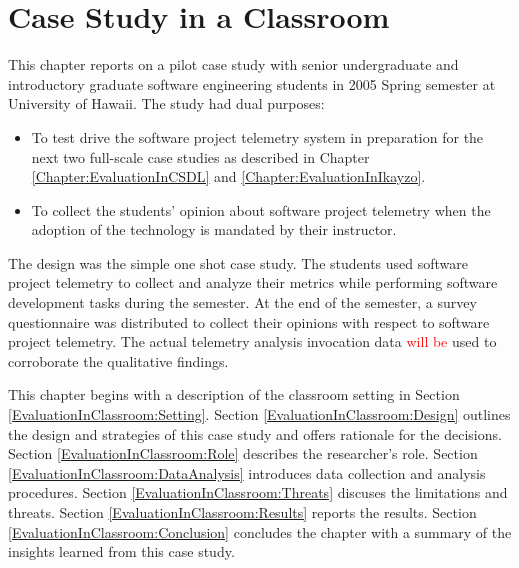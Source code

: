 \chapter{Case Study in a Classroom}  \label{Chapter:EvaluationInClassroom}
 

This chapter reports on a pilot case study with senior undergraduate and introductory graduate software engineering students in 2005 Spring semester at University of Hawaii. The study had dual purposes:
\begin{itemize}
	\item To test drive the software project telemetry system in preparation for the next two full-scale case studies as described in Chapter \ref{Chapter:EvaluationInCSDL} and \ref{Chapter:EvaluationInIkayzo}.
	\item To collect the students' opinion about software project telemetry when the adoption of the technology is mandated by their instructor.
\end{itemize}

The design was the simple one shot case study. The students used software project telemetry to collect and analyze their metrics while performing software development tasks during the semester. At the end of the semester, a survey questionnaire was distributed to collect their opinions with respect to software project telemetry. The actual telemetry analysis invocation data \textcolor{red}{will be} used to corroborate the qualitative findings.

This chapter begins with a description of the classroom setting in Section \ref{EvaluationInClassroom:Setting}.
Section \ref{EvaluationInClassroom:Design} outlines the design and strategies of this case study and offers rationale for the decisions.
Section \ref{EvaluationInClassroom:Role} describes the researcher's role.
Section \ref{EvaluationInClassroom:DataAnalysis} introduces data collection and analysis procedures.
Section \ref{EvaluationInClassroom:Threats} discuses the limitations and threats. 
Section \ref{EvaluationInClassroom:Results} reports the results. 
Section \ref{EvaluationInClassroom:Conclusion} concludes the chapter with a summary of the insights learned from this case study.





